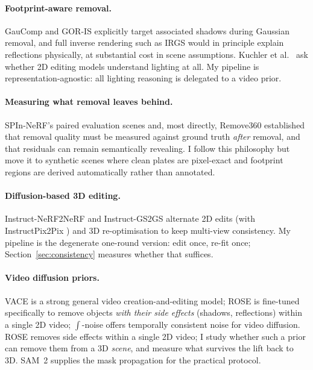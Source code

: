 \documentclass[11pt]{article}
\begin{document}
\paragraph{Footprint-aware removal.}
GauComp \cite{gaucomp} and GOR-IS \cite{goris} explicitly target associated shadows during Gaussian removal, and full inverse rendering such as IRGS \cite{irgs} would in principle explain reflections physically, at substantial cost in scene assumptions. Kuchler et al.\ \cite{lighting} ask whether 2D editing models understand lighting at all. My pipeline is representation-agnostic: all lighting reasoning is delegated to a video prior.

\paragraph{Measuring what removal leaves behind.}
SPIn-NeRF's paired evaluation scenes and, most directly, Remove360 \cite{remove360,semanticresiduals} established that removal quality must be measured against ground truth \emph{after} removal, and that residuals can remain semantically revealing. I follow this philosophy but move it to synthetic scenes where clean plates are pixel-exact and footprint regions are derived automatically rather than annotated.

\paragraph{Diffusion-based 3D editing.}
Instruct-NeRF2NeRF \cite{in2n} and Instruct-GS2GS \cite{igs2gs} alternate 2D edits (with InstructPix2Pix \cite{ip2p}) and 3D re-optimisation to keep multi-view consistency. My pipeline is the degenerate one-round version: edit once, re-fit once; Section~\ref{sec:consistency} measures whether that suffices.

\paragraph{Video diffusion priors.}
VACE \cite{vace} is a strong general video creation-and-editing model; ROSE \cite{rose} is fine-tuned specifically to remove objects \emph{with their side effects} (shadows, reflections) within a single 2D video; $\int$-noise \cite{warpnoise} offers temporally consistent noise for video diffusion. ROSE removes side effects within a single 2D video; I study whether such a prior can remove them from a 3D \emph{scene}, and measure what survives the lift back to 3D. SAM~2 \cite{sam2} supplies the mask propagation for the practical protocol.
\end{document}
